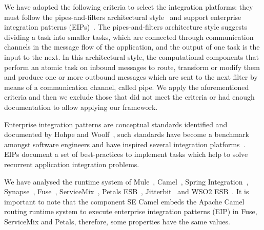 We have adopted the following criteria to select the integration platforms: they must follow the pipes-and-filters architectural style~\cite{alexander1977} and support enterprise integration patterns (EIPs)~\cite{hohpe2004}.
The pipes-and-filters architecture style suggests dividing a task into smaller tasks, which are connected through communication channels in the message flow of the application, and the output of one task is the input to the next. In this architectural style, the computational components that perform an atomic task on inbound messages to route, transform or modify them and produce one or more outbound messages which are sent to the next filter by means of a communication channel, called pipe. We apply the aforementioned criteria and then we exclude those that did not meet the criteria or had enough documentation to allow applying our framework.

Enterprise integration patterns are conceptual standards identified and documented by Hohpe and Woolf~\cite{hohpe2004}, such standards have become a benchmark amongst software engineers and have inspired several integration platforms~\cite{isen2010,dossot2014,fisher2012,frantz2012}. EIPs document a set of best-practices to implement tasks which help to solve recurrent application integration problems.

We have analysed the runtime system of Mule~\cite{dossot2014}, Camel~\cite{isen2010}, Spring Integration~\cite{fisher2012}, Synapse~\cite{rademakers2008,jayasinghe2011}, Fuse~\cite{russell2012}, ServiceMix~\cite{konsek2013}, Petals ESB~\cite{surhone2010}, Jitterbit~\cite{russell2012_1} and WSO2 ESB~\cite{indrasiri2016}. It is important to note that the component SE Camel embeds the Apache Camel routing runtime system to execute enterprise integration patterns (EIP) in Fuse, ServiceMix and Petals, therefore, some properties have the same values.


